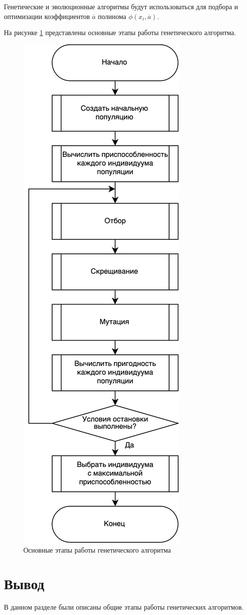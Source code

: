 Генетические и эволюционные  алгоритмы будут использоваться для подбора и оптимизации коэффициентов $\overline{a}$ полинома $\phi(x_i, \overline{a})$.

На рисунке \ref{img:algo} представлены основные этапы работы генетического алгоритма.~\cite{book1}

\begin{figure}
	\begin{center}
		\includegraphics[height=0.95\textheight]{images/algo.png}
	\end{center}
	\caption{Основные этапы работы генетического алгоритма}
	\label{img:algo}
\end{figure}



\section*{Вывод}

В данном разделе были описаны общие этапы работы генетических алгоритмов.

\clearpage
